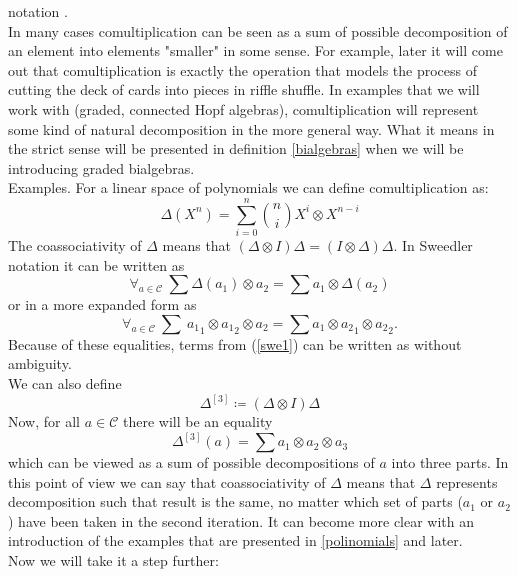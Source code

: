 \documentclass[a4paper, 12pt]{article}
\begin{document}
notation . \\
In many cases comultiplication can be seen as a sum of possible decomposition of an element into
elements "smaller" in some sense.
For example, later it will come out that comultiplication is exactly the operation that
models the process of cutting the deck of cards into pieces in riffle shuffle. In examples that we will
work with (graded, connected Hopf algebras), comultiplication will represent some kind of natural
decomposition in the more general way. What it means in the strict sense will be presented in
definition \ref{bialgebras} when we will be introducing graded bialgebras. \\
Examples.
For a linear space of polynomials we can define comultiplication as:
\[
    \Delta(X^n) = \sum_{i=0}^n \binom{n}{i} X^i \otimes X^{n-i}
\]
The coassociativity of $\Delta$ means that $(\Delta \otimes I)\Delta = (I \otimes \Delta)\Delta$.
In Sweedler notation it can be written as
\begin{equation*}
\forall_{a \in \mathcal{C}}\ \sum\Delta(a_1) \otimes a_2 = \sum a_1 \otimes \Delta(a_2)
\end{equation*}
or in a more expanded form as
\begin{equation}\label{swe1}
\forall_{a\in \mathcal{C}}\ \sum\ {a_1}_1 \otimes {a_1}_2 \otimes a_2 = \sum a_1 \otimes {a_2}_1
\otimes {a_2}_2.
\end{equation}
Because of these equalities, terms from (\ref{swe1}) can be written as
 without ambiguity. \\
We can also define
\begin{equation*}
\Delta^{[3]} \coloneqq (\Delta \otimes I)\Delta
\end{equation*}
Now, for all $a \in \mathcal{C}$ there will be an equality
\begin{equation*}
\Delta^{[3]}(a) = \sum a_1 \otimes a_2 \otimes a_3
\end{equation*}
which can be viewed as a sum of possible decompositions of $a$ into three parts.
In this point of view we can say that coassociativity of $\Delta$ means that $\Delta$ represents
decomposition such that result is the same, no matter which set of parts ($a_1$ or $a_2$) have been taken
in the second iteration. It can become more
clear with an introduction of the examples that are presented in \ref{polinomials} and later. \\
Now we will take it a step further: \\[8pt]
\end{document}
